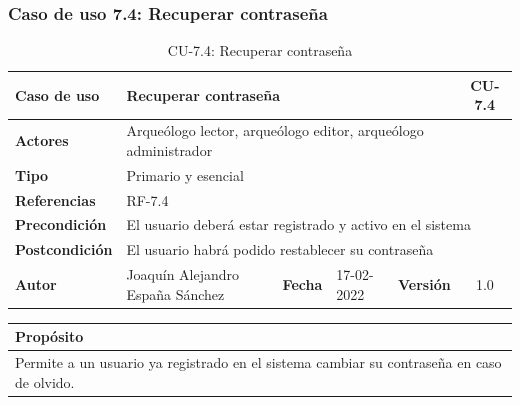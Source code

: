 \subsubsection{Caso de uso 7.4: Recuperar contraseña}

    \begin{table}[H]
    \begin{center}
        \begin{adjustbox}{width=\textwidth}
        \begin{tabular}{ | l | l | l | l | c | c | } 
            \hline
            \textbf{Caso de uso} & \multicolumn{4}{l|}{Recuperar contraseña} & \cellcolor{gray!50} \textbf{CU-7.4}\\
            \hline
            \textbf{Actores} & \multicolumn{5}{p{0.9\linewidth}|}{Arqueólogo lector, arqueólogo editor, arqueólogo administrador} \\
            \hline
            \textbf{Tipo} & \multicolumn{5}{l|}{Primario y esencial} \\
            \hline
            \textbf{Referencias} & \multicolumn{3}{l|}{RF-7.4} & \multicolumn{2}{l|}{ }\\
            \hline
            \textbf{Precondición} & \multicolumn{5}{l|}{El usuario deberá estar registrado y activo en el sistema} \\
            \hline
            \textbf{Postcondición} & \multicolumn{5}{l|}{El usuario habrá podido restablecer su contraseña} \\
            \hline
            \textbf{Autor} & \multicolumn{1}{p{0.25\linewidth}|}{Joaquín Alejandro España Sánchez} & \textbf{Fecha} & 
            17-02-2022     & \textbf{Versión}                                                      & 1.0\\
            \hline
        \end{tabular}
        \end{adjustbox}
        \caption{CU-7.4: Recuperar contraseña}
        \label{tab:reset-password}
    \end{center}
    \end{table}

    \begin{table}[H]
        \centering
        \begin{tabularx}{\textwidth}{@{} |L |@{}} \hline
            \textbf{Propósito} \\
            \hline
            Permite a un usuario ya registrado en el sistema cambiar su contraseña en caso
            de olvido. \\
            \hline
        \end{tabularx}
    \end{table}

